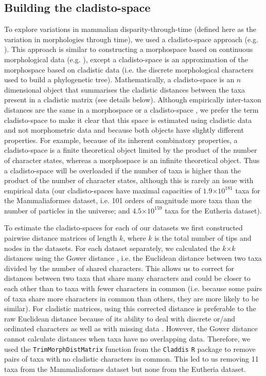 \documentclass[10pt,letterpaper]{article}
\begin{document}
\subsection*{Building the cladisto-space}
To explore variations in mammalian disparity-through-time (defined here as the variation in morphologies through time), we used a cladisto-space approach (e.g. \cite{Foote01071994,Foote29111996,Wesley-Hunt2005,Brusatte12092008,friedmanexplosive2010,toljagictriassic-jurassic2013,Hughes20082013}).
This approach is similar to constructing a morphospace based on continuous morphological data (e.g. \cite{friedmanexplosive2010}), except a cladisto-space is an approximation of the morphospace based on cladistic data (i.e. the discrete morphological characters used to build a phylogenetic tree).
Mathematically, a cladisto-space is an $n$ dimensional object that summarises the cladistic distances between the taxa present in a cladistic matrix (see details below).
Although empirically inter-taxon distances are the same in a morphospace or a cladisto-space \cite{foth2012different,hetherington2015cladistic}, we prefer the term cladisto-space to make it clear that this space is estimated using cladistic data and not morphometric data and because both objects have slightly different properties.
For example, because of its inherent combinatory properties, a cladisto-space is a finite theoretical object limited by the product of the number of character states, whereas a morphospace is an infinite theoretical object.
Thus a cladisto-space will be overloaded if the number of taxa is higher than the product of the number of character states, although this is rarely an issue with empirical data (our cladisto-spaces have maximal capacities of $1.9$$\times$$10^{181}$ taxa for the Mammaliaformes dataset, i.e. 101 orders of magnitude more taxa than the number of particles in the universe; and $4.5$$\times$$10^{159}$ taxa for the Eutheria dataset).

To estimate the cladisto-spaces for each of our datasets we first constructed pairwise distance matrices of length $k$, where $k$ is the total number of tips and nodes in the datasets.
For each dataset separately, we calculated the $k$$\times$$k$ distances using the Gower distance \cite{Gower71}, i.e. the Euclidean distance between two taxa divided by the number of shared characters. 
This allows us to correct for distances between two taxa that share many characters and could be closer to each other than to taxa with fewer characters in common (i.e. because some pairs of taxa share more characters in common than others, they are more likely to be similar).
For cladistic matrices, using this corrected distance is preferable to the raw Euclidean distance because of its ability to deal with discrete or/and ordinated characters as well as with missing data \cite{anderson2012using}.
However, the Gower distance cannot calculate distances when taxa have no overlapping data.
Therefore, we used the \texttt{TrimMorphDistMatrix} function from the \texttt{Claddis} \texttt{R} package \cite{Claddis} to remove pairs of taxa with no cladistic characters in common.
This led to us removing 11 taxa from the Mammaliaformes dataset but none from the Eutheria dataset.
\end{document}
